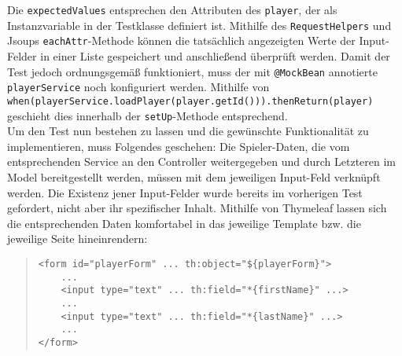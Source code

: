 Die \texttt{expectedValues} entsprechen den Attributen des \texttt{player}, der als 
Instanzvariable in der Testklasse definiert ist. Mithilfe des 
\texttt{RequestHelpers} und Jsoups \texttt{eachAttr}-Methode können die tatsächlich 
angezeigten Werte der Input-Felder in einer Liste gespeichert und anschließend 
überprüft werden. Damit der Test jedoch ordnungsgemäß funktioniert, muss der mit 
\texttt{@MockBean} annotierte \texttt{playerService} noch konfiguriert werden. 
Mithilfe von 
\texttt{when(playerService.loadPlayer(player.getId())).thenReturn(player)} 
geschieht dies innerhalb der \texttt{setUp}-Methode entsprechend. \\ 
Um den Test nun bestehen zu lassen und die gewünschte Funktionalität zu 
implementieren, muss Folgendes geschehen: Die Spieler-Daten, die vom 
entsprechenden Service an den Controller weitergegeben und durch Letzteren im 
Model bereitgestellt werden, müssen mit dem jeweiligen Input-Feld verknüpft werden. 
Die Existenz jener Input-Felder wurde bereits im vorherigen Test gefordert, nicht 
aber ihr spezifischer Inhalt. Mithilfe von Thymeleaf lassen sich die entsprechenden 
Daten komfortabel in das jeweilige Template bzw. die jeweilige Seite hineinrendern: 

\begin{quote}
\begin{verbatim}
<form id="playerForm" ... th:object="${playerForm}">
    ...
    <input type="text" ... th:field="*{firstName}" ...>
    ...
    <input type="text" ... th:field="*{lastName}" ...>
    ...
</form>
\end{verbatim}
\end{quote}

